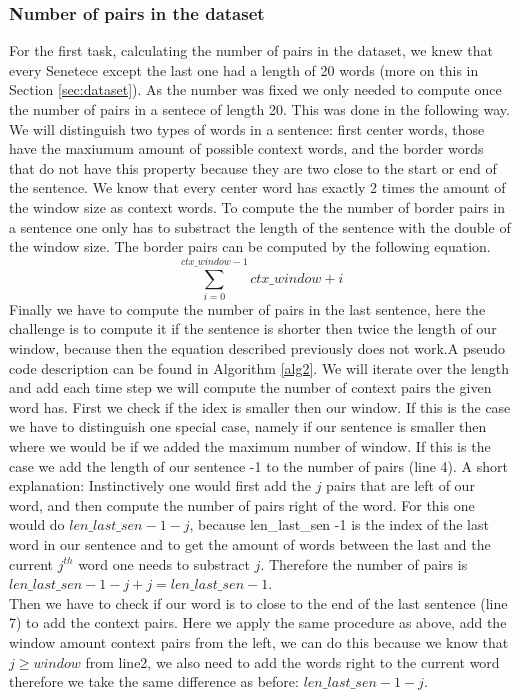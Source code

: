 \subsubsection{Number of pairs in the dataset}
For the first task, calculating the number of pairs in the dataset, we knew that every Senetece except the last one had a length of 20 words (more on this in Section \ref{sec:dataset}). As the number was fixed we only needed to compute once the number of pairs in a sentece of length 20. This was done in the following way. We will distinguish two types of words in a sentence: first center words, those have the maxiumum amount of possible context words, and the border words that do not have this property because they are two close to the start or end of the sentence.
We know that every center word has exactly 2 times the amount of the window size as context words. To compute the the number of border pairs in a sentence one only has to substract the length of the sentence with the double of the window size. The border pairs can be computed by the following equation. 
\begin{equation}
\sum_{i=0}^{ctx\_window -1} ctx\_window + i
\end{equation}
Finally we have to compute the number of pairs in the last sentence, here the challenge is to compute it if the sentence is shorter then twice the length of our window, because then the equation described previously does not work.A pseudo code description can be found in Algorithm \ref{alg2}. We will iterate over the length and add each time step we will compute the number of context pairs the given word has. First we check if the idex is smaller then our window. If this is the case we have to distinguish one special case, namely if our sentence is smaller then where we would be if we added the maximum number of window. If this is the case we add the length of our sentence -1 to the number of pairs (line 4). A short explanation: Instinctively one would first add the $j$ pairs that are left of our word, and then compute the number of pairs right of the word. For this one would do $len\_last\_sen -1 -j$, because len\_last\_sen -1  is the index of the last word in our sentence and to get the amount of words between the  last and the current $j^{th}$ word one needs to substract $j$. Therefore the number of pairs is $len\_last\_sen -1 -j + j = len\_last\_sen -1$.\\ Then we have to check if our word is to close to the end of the last sentence (line 7) to add the context pairs. Here we apply the same procedure as above, add the window amount context pairs from the left, we can do this because we know that $j \geq window$ from line2, we also need to add the words right to the current word therefore we take the same difference as before: $len\_last\_sen -1 -j$.
